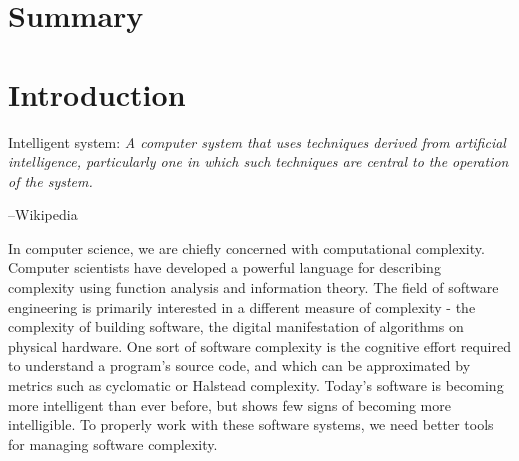 \documentclass[12pt,initial,twoside,maitrise]{dms}
\numberwithin{equation}{section}
\numberwithin{table}{chapter}
\numberwithin{figure}{chapter}
\begin{document}

\chapter*{Summary}


\anglais
\cleardoublepage
{}  %
\tableofcontents
\cleardoublepage
{}  %
\listoftables
\cleardoublepage
{}
\listoffigures

\NoChapterPageNumber
\cleardoublepage
{}

\chapter{Introduction}\label{ch:introduction}

\setlength{\epigraphwidth}{0.9\textwidth}
\epigraph{Intelligent system: \textit{A computer system that uses techniques derived from artificial intelligence, particularly one in which such techniques are central to the operation of the system.}}{\begin{flushright}--Wikipedia\end{flushright}}

In computer science, we are chiefly concerned with computational complexity. Computer scientists have developed a powerful language for describing complexity using function analysis and information theory. The field of software engineering is primarily interested in a different measure of complexity - the complexity of building software, the digital manifestation of algorithms on physical hardware. One sort of software complexity is the cognitive effort required to understand a program's source code, and which can be approximated by metrics such as cyclomatic or Halstead complexity. Today's software is becoming more intelligent than ever before, but shows few signs of becoming more intelligible. To properly work with these software systems, we need better tools for managing software complexity.
\end{document}
